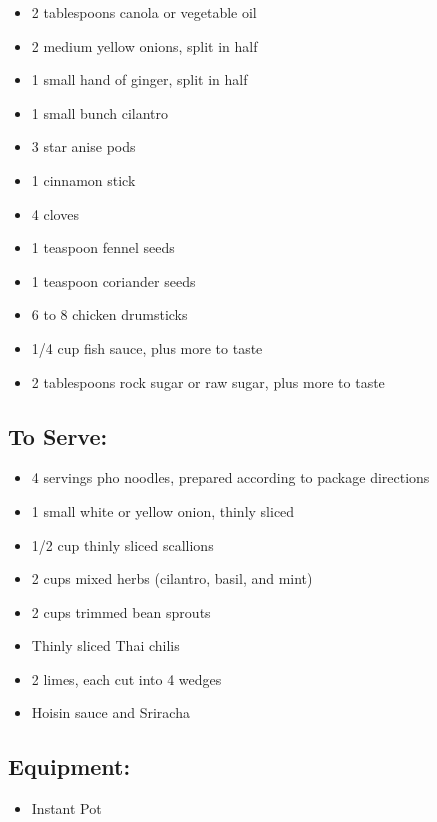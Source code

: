 \documentclass[]{article}
\providecommand{\tightlist}{%
  \setlength{\itemsep}{0pt}\setlength{\parskip}{0pt}}
\begin{document}
\begin{itemize}
\tightlist
\item
  2 tablespoons canola or vegetable oil
\item
  2 medium yellow onions, split in half
\item
  1 small hand of ginger, split in half
\item
  1 small bunch cilantro
\item
  3 star anise pods
\item
  1 cinnamon stick
\item
  4 cloves
\item
  1 teaspoon fennel seeds
\item
  1 teaspoon coriander seeds
\item
  6 to 8 chicken drumsticks
\item
  1/4 cup fish sauce, plus more to taste
\item
  2 tablespoons rock sugar or raw sugar, plus more to taste
\end{itemize}

\hypertarget{to-serve}{%
\subsection{To Serve:}\label{to-serve}}

\begin{itemize}
\tightlist
\item
  4 servings pho noodles, prepared according to package directions
\item
  1 small white or yellow onion, thinly sliced
\item
  1/2 cup thinly sliced scallions
\item
  2 cups mixed herbs (cilantro, basil, and mint)
\item
  2 cups trimmed bean sprouts
\item
  Thinly sliced Thai chilis
\item
  2 limes, each cut into 4 wedges
\item
  Hoisin sauce and Sriracha
\end{itemize}

\hypertarget{equipment}{%
\subsection{Equipment:}\label{equipment}}

\begin{itemize}
\tightlist
\item
  Instant Pot
\end{itemize}
\end{document}
